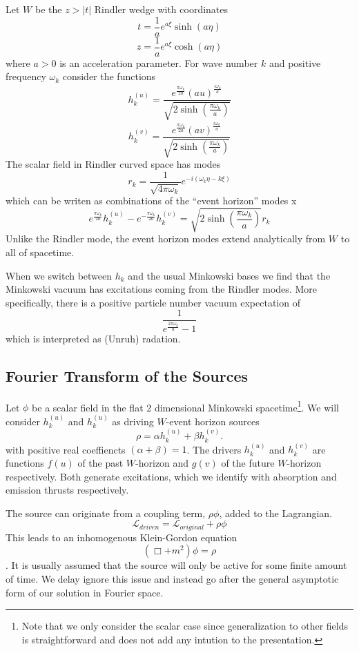 \documentclass[12pt,a4paper]{article}
\begin{document}
Let $W$ be the $z>|t|$ Rindler wedge with coordinates
\[
t = \frac{1}{a}e^{a\xi}\sinh{(a\eta)}
\]
\[
z = \frac{1}{a}e^{a\xi}\cosh{(a\eta)}
\]
where $a>0$ is an acceleration parameter.  For wave number $k$ and positive frequency $\omega_k$ consider the functions
\[
h^{(u)}_k = \frac{e^{\frac{\pi \omega_k}{2a}} {(au)}^{\frac{i\omega_k}{a}}}{ \sqrt{2\sinh\left(\frac{\pi\omega_k}{a}\right)} }
\]
\[
h^{(v)}_k = \frac{e^{\frac{\pi \omega_k}{2a}} {(av)}^{\frac{i\omega_k}{a}}}{ \sqrt{2\sinh\left(\frac{\pi\omega_k}{a}\right)} }
\]
The scalar field in Rindler curved space has modes
\[
 r_k = \frac{1}{\sqrt{4 \pi \omega_k}} e^{-i(\omega_k \eta -k \xi)}
\]
which can be writen as combinations of the ``event horizon'' modes
x\[
e^\frac{\pi\omega_k}{2a} h^{(u)}_k - e^{-\frac{\pi\omega_k}{2a}} h^{(v)}_k  = \sqrt{2 \sinh \left({\frac{\pi\omega_k}{a}}\right)} r_k
\]
Unlike the Rindler mode, the event horizon modes extend analytically from $W$ to all of spacetime.


When we switch between $h_k$ and the usual Minkowski bases we find that the Minkowski vacuum has excitations coming from the Rindler modes.  More specifically, there is a positive particle number vacuum expectation of
\begin{equation}
\label{radeq}
\frac{1}{e^{\frac{2 \pi \omega_k}{a}}-1}
\end{equation}
which is interpreted as (Unruh) radation.

\subsection{Fourier Transform of the Sources}

Let $\phi$ be a scalar field in the flat 2 dimensional Minkowski spacetime\footnote{Note that we only consider the scalar case since generalization to other fields is straightforward and does not add any intution to the presentation.}.  We will consider $h^{(u)}_k$ and $h^{(u)}_k$ as driving $W$-event horizon sources
\[
\rho = \alpha h^{(u)}_k + \beta h^{(v)}_k.
\]
with positive real coeffiencts $(\alpha + \beta) = 1$.
The drivers $h^{(u)}_k$ and $h^{(v)}_k$ are functions $f(u)$ of the past $W$-horizon and $g(v)$ of the future $W$-horizon respectively.  Both generate excitations, which we identify with absorption and emission thrusts respectively.


The source can originate from a coupling term, $\rho \phi$, added to the Lagrangian.
\[
\mathcal{L}_{driven} = \mathcal{L}_{original} + \rho\phi 
\]
This leads to an inhomogenous Klein-Gordon equation
\[
(\Box + m^2) \phi = \rho
\]
\cite{beisert}. It is usually assumed that the source will only be active for some finite amount of time.  We delay ignore this issue and instead go after the general asymptotic form of our solution in Fourier space.
\end{document}
